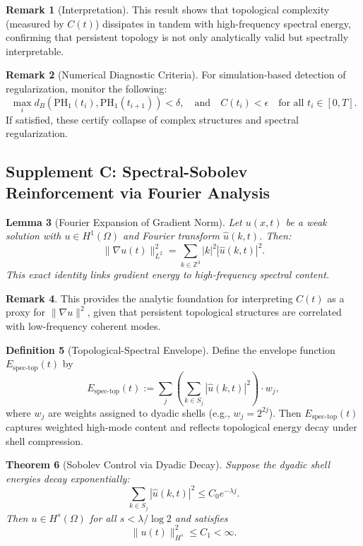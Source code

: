 \documentclass[11pt]{article}
\newtheorem{theorem}{Theorem}[section]
\newtheorem{lemma}[theorem]{Lemma}
\theoremstyle{definition}
\newtheorem{definition}[theorem]{Definition}
\newtheorem{remark}[theorem]{Remark}
\begin{document}
\begin{remark}[Interpretation]
This result shows that topological complexity (measured by $C(t)$) dissipates in tandem with high-frequency spectral energy, confirming that persistent topology is not only analytically valid but spectrally interpretable.
\end{remark}

\begin{remark}[Numerical Diagnostic Criteria]
For simulation-based detection of regularization, monitor the following:
\[
\max_i d_B(\mathrm{PH}_1(t_i), \mathrm{PH}_1(t_{i+1})) < \delta, \quad \text{and} \quad C(t_i) < \epsilon \quad \text{for all } t_i \in [0,T].
\]
If satisfied, these certify collapse of complex structures and spectral regularization.
\end{remark}

\subsection*{Supplement C: Spectral-Sobolev Reinforcement via Fourier Analysis}

\begin{lemma}[Fourier Expansion of Gradient Norm]
Let $u(x,t)$ be a weak solution with $u \in H^1(\Omega)$ and Fourier transform $\hat{u}(k,t)$. Then:
\[
\|\nabla u(t)\|_{L^2}^2 = \sum_{k \in \mathbb{Z}^3} |k|^2 |\hat{u}(k,t)|^2.
\]
This exact identity links gradient energy to high-frequency spectral content.
\end{lemma}

\begin{remark}
This provides the analytic foundation for interpreting $C(t)$ as a proxy for $\|\nabla u\|^2$, given that persistent topological structures are correlated with low-frequency coherent modes.
\end{remark}

\begin{definition}[Topological-Spectral Envelope]
Define the envelope function $E_{\text{spec-top}}(t)$ by
\[
E_{\text{spec-top}}(t) := \sum_j \left( \sum_{k \in S_j} |\hat{u}(k,t)|^2 \right) \cdot w_j,
\]
where $w_j$ are weights assigned to dyadic shells (e.g., $w_j = 2^{2j}$). Then $E_{\text{spec-top}}(t)$ captures weighted high-mode content and reflects topological energy decay under shell compression.
\end{definition}

\begin{theorem}[Sobolev Control via Dyadic Decay]
Suppose the dyadic shell energies decay exponentially:
\[
\sum_{k \in S_j} |\hat{u}(k,t)|^2 \leq C_0 e^{-\lambda j}.
\]
Then $u \in H^s(\Omega)$ for all $s < \lambda / \log 2$ and satisfies
\[
\|u(t)\|_{H^s}^2 \leq C_1 < \infty.
\]
\end{theorem}
\end{document}
